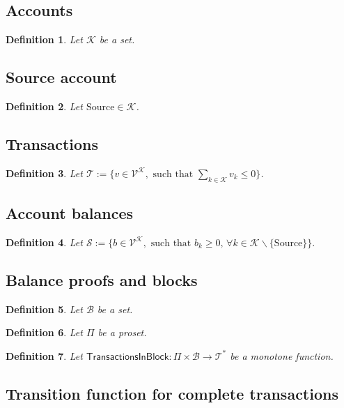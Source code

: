 \documentclass[runningheads]{llncs}
\newtheorem{defn}{Definition}
\newcommand{\source}{\text{Source}}
\newcommand{\K}{\mathcal{K}}
\newcommand{\V}{\mathcal{V}}
\newcommand{\T}{\mathcal{T}}
\renewcommand{\S}{\mathcal{S}}
\newcommand{\B}{\mathcal{B}}
\begin{document}
\subsection{Accounts}

\begin{defn}
  Let \(\K\) be a set.
\end{defn}

\subsection{Source account}

\begin{defn}
  Let \(\source \in \K\).
\end{defn}

\subsection{Transactions}

\begin{defn}
  Let \(\T := \{v \in \V^\K, \text{ such that } \sum_{k \in \K} v_k
  \leq 0\}\).
\end{defn}

\subsection{Account balances}

\begin{defn}
  Let \(\S := \{b \in
      \V^{\K}, \text{ such that } b_k \geq 0,\, \forall k \in \K
  \backslash \{\source\}\}.\)
\end{defn}

\subsection{Balance proofs and blocks}

\begin{defn}
  Let \(\B\) be a set.
\end{defn}

\begin{defn}
  Let \(\Pi\) be a proset.
\end{defn}

\begin{defn}
  Let \(\mathsf{TransactionsInBlock} : \Pi \times \B \to \T^*\) be a
  monotone function.
\end{defn}

\subsection{Transition function for complete transactions}
\end{document}
